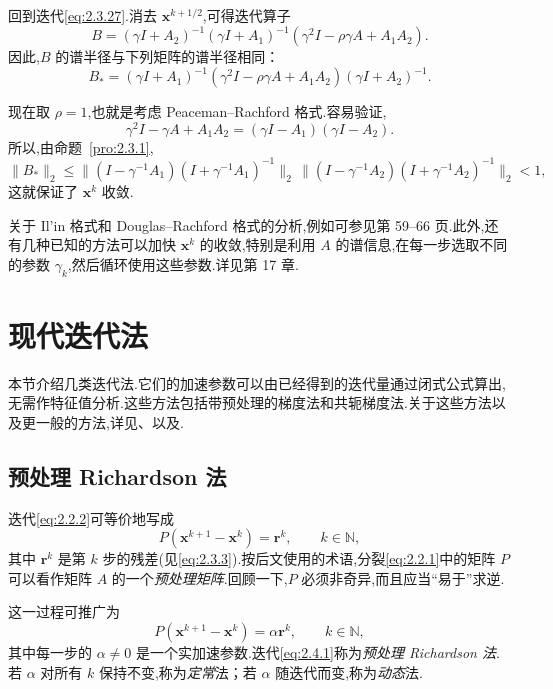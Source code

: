 回到迭代\eqref{eq:2.3.27}.消去 \(\boldsymbol{x}^{k+1/2}\),可得迭代算子
\begin{equation}\label{eq:2.3.30}
  B=(\gamma I+A_2)^{-1}(\gamma I+A_1)^{-1}(\gamma^2 I-\rho\gamma A+A_1A_2).
\end{equation}
因此,\(B\) 的谱半径与下列矩阵的谱半径相同：
\begin{equation}\label{eq:2.3.31}
  B_*=(\gamma I+A_1)^{-1}(\gamma^2 I-\rho\gamma A+A_1A_2)(\gamma I+A_2)^{-1}.
\end{equation}

现在取 \(\rho=1\),也就是考虑 Peaceman--Rachford 格式.容易验证,
\[
  \gamma^2 I-\gamma A+A_1A_2=(\gamma I-A_1)(\gamma I-A_2).
\]
所以,由命题~\ref{pro:2.3.1},
\[
  \|B_*\|_2
  \le\|(I-\gamma^{-1}A_1)(I+\gamma^{-1}A_1)^{-1}\|_2\,
     \|(I-\gamma^{-1}A_2)(I+\gamma^{-1}A_2)^{-1}\|_2<1,
\]
这就保证了 \(\boldsymbol{x}^k\) 收敛.

关于 Il’in 格式和 Douglas--Rachford 格式的分析,例如可参见第 59–66 页.此外,还有几种已知的方法可以加快 \(\boldsymbol{x}^k\) 的收敛,特别是利用 \(A\) 的谱信息,在每一步选取不同的参数 \(\gamma_k\),然后循环使用这些参数.详见第 17 章.

\section{现代迭代法}\label{sec:2.4}

本节介绍几类迭代法.它们的加速参数可以由已经得到的迭代量通过闭式公式算出,无需作特征值分析.这些方法包括带预处理的梯度法和共轭梯度法.关于这些方法以及更一般的方法,详见、以及.

\subsection{预处理 Richardson 法}\label{sec:2.4.1}

迭代\eqref{eq:2.2.2}可等价地写成
\[
  P(\boldsymbol{x}^{k+1}-\boldsymbol{x}^k)=\boldsymbol{r}^k,\qquad k\in\mathbb N,
\]
其中 \(\boldsymbol{r}^k\) 是第 \(k\) 步的残差(见\eqref{eq:2.3.3}).按后文使用的术语,分裂\eqref{eq:2.2.1}中的矩阵 \(P\) 可以看作矩阵 \(A\) 的一个\emph{预处理矩阵}.回顾一下,\(P\) 必须非奇异,而且应当“易于”求逆.

这一过程可推广为
\begin{equation}\label{eq:2.4.1}
  P(\boldsymbol{x}^{k+1}-\boldsymbol{x}^k)=\alpha\boldsymbol{r}^k,\qquad k\in\mathbb N,
\end{equation}
其中每一步的 \(\alpha\ne0\) 是一个实加速参数.迭代\eqref{eq:2.4.1}称为\emph{预处理 Richardson 法}.若 \(\alpha\) 对所有 \(k\) 保持不变,称为\emph{定常}法；若 \(\alpha\) 随迭代而变,称为\emph{动态}法.


